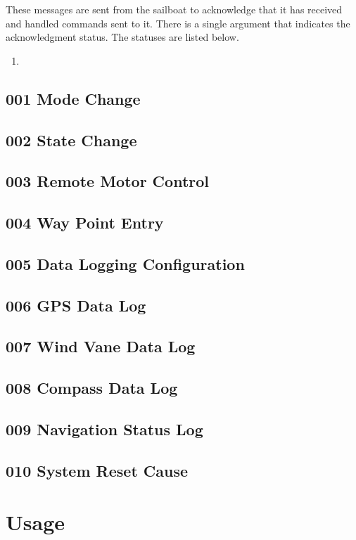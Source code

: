 \documentclass[12pt]{article}
\def\threedigits#1{%
	\ifnum#1<100 0\fi
	\ifnum#1<10 0\fi
	\number#1}
\begin{document}
These messages are sent from the sailboat to acknowledge that it has received and handled commands sent to it. There is a single argument that indicates the acknowledgment status. The statuses are listed below.

\begin{enumerate}[label={\textbf{\protect\threedigits{\theenumi}}}, start=0, leftmargin=0.4\linewidth]
	\setlength\itemsep{0.1em}
	\item 
\end{enumerate}

\subsection*{\textbf{001} Mode Change}

\subsection*{\textbf{002} State Change}

\subsection*{\textbf{003} Remote Motor Control}

\subsection*{\textbf{004} Way Point Entry}

\subsection*{\textbf{005} Data Logging Configuration}

\subsection*{\textbf{006} GPS Data Log}

\subsection*{\textbf{007} Wind Vane Data Log}

\subsection*{\textbf{008} Compass Data Log}

\subsection*{\textbf{009} Navigation Status Log}

\subsection*{\textbf{010} System Reset Cause}

\section*{Usage}
\end{document}
